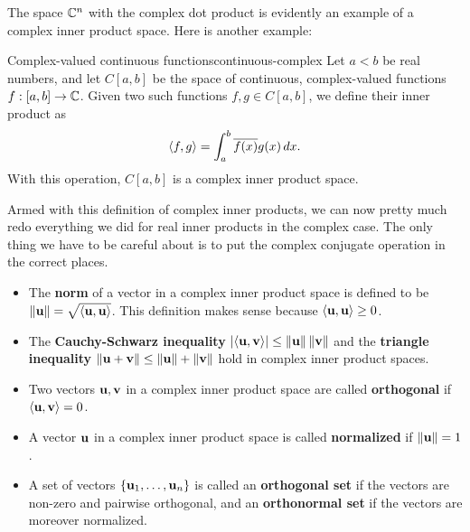 The space $\mathbb{C}^n$ with the complex dot product is evidently an example
of a complex inner product space. Here is another example:

\begin{example}{Complex-valued continuous functions}{continuous-complex}
  Let $a<b$ be real numbers, and let $C[a,b]$ be the space of
  continuous, complex-valued functions $f : [a,b]\to\mathbb{C}$. Given two such
  functions $f,g\in C[a,b]$, we define their inner product as
  \begin{equation*}
    \langle f,g\rangle = \int_a^b \overline{f(x)}g(x)\,dx.
  \end{equation*}
  With this operation, $C[a,b]$ is a complex inner product space.
\end{example}

Armed with this definition of complex inner products, we can now
pretty much redo everything we did for real inner products in the
complex case. The only thing we have to be careful about is to put the
complex conjugate operation in the correct places.

\begin{itemize}
\item The \textbf{norm}%
   of a vector in a complex inner
  product space is defined to be
  $\norm{\vect{u}} = \sqrt{\iprod{\vect{u},\vect{u}}}$.  This
  definition makes sense because $\iprod{\vect{u},\vect{u}}\geq 0$.
\item The \textbf{Cauchy-Schwarz inequality}%
  $\abs{\iprod{\vect{u},\vect{v}}}\leq \norm{\vect{u}}\norm{\vect{v}}$
  and the \textbf{triangle inequality}%
  $\norm{\vect{u}+\vect{v}}\leq \norm{\vect{u}} + \norm{\vect{v}}$
  hold in complex inner product spaces.
\item Two vectors $\vect{u},\vect{v}$ in a complex inner product space
  are called \textbf{orthogonal}%
   if $\iprod{\vect{u},\vect{v}}=0$.
\item A vector $\vect{u}$ in a complex inner product space is called
  \textbf{normalized}%
   if $\norm{\vect{u}} = 1$.
\item A set of vectors $\set{\vect{u}_1,\ldots,\vect{u}_n}$ is called
  an \textbf{orthogonal set}%
   if the vectors are non-zero and pairwise
  orthogonal, and an \textbf{orthonormal set}%
   if the vectors are moreover normalized.
\end{itemize}

